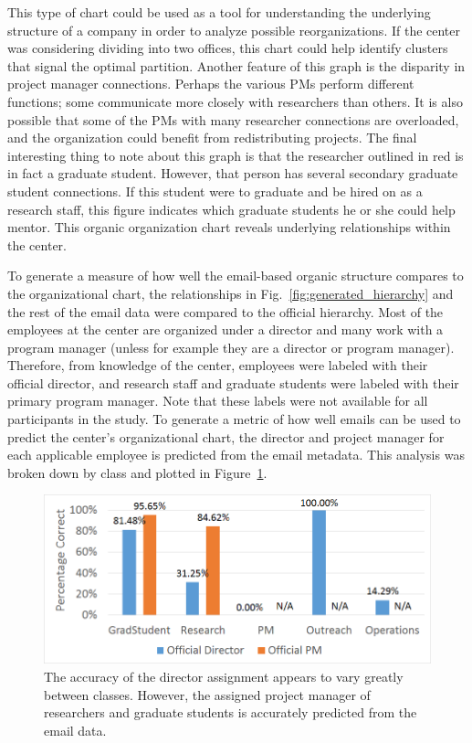 \documentclass[12pt]{report}
\begin{document}
This type of chart could be used as a tool for understanding the underlying structure of a company in order to analyze possible reorganizations.
If the center was considering dividing into two offices, this chart could help identify clusters that signal the optimal partition.
Another feature of this graph is the disparity in project manager connections.
Perhaps the various PMs perform different functions; some communicate more closely with researchers than others.
It is also possible that some of the PMs with many researcher connections are overloaded, and the organization could benefit from redistributing projects.
The final interesting thing to note about this graph is that the researcher outlined in red is in fact a graduate student.
However, that person has several secondary graduate student connections.
If this student were to graduate and be hired on as a research staff, this figure indicates which graduate students he or she could help mentor.
This organic organization chart reveals underlying relationships within the center.

To generate a measure of how well the email-based organic structure compares to the organizational chart, the relationships in Fig.~\ref{fig:generated_hierarchy} and the rest of the email data were compared to the official hierarchy.
Most of the employees at the center are organized under a director and many work with a program manager (unless for example they are a director or program manager).
Therefore, from knowledge of the center, employees were labeled with their official director, and research staff and graduate students were labeled with their primary program manager.
Note that these labels were not available for all participants in the study.
To generate a metric of how well emails can be used to predict the center's organizational chart, the director and project manager for each applicable employee is predicted from the email metadata. 
This analysis was broken down by class and plotted in Figure~\ref{fig:project_classify}.

\begin{figure}[t]
	\centering
	\includegraphics[width=0.8\columnwidth,trim={2mm 2mm 2mm 2mm},clip]{superior_identification}
	\vspace{-7pt}
	\caption[Project manager and director prediction results]{The accuracy of the director assignment appears to vary greatly between classes.  However, the assigned project manager of researchers and graduate students is accurately predicted from the email data.}
	\label{fig:project_classify}
\end{figure}
\end{document}
